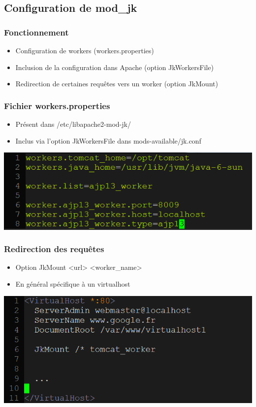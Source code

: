 \subsection{Configuration de mod\_jk}
\begin{frame}
	\frametitle{Fonctionnement}
	
	\begin{itemize}
		\item Configuration de \og{} workers \fg{} (workers.properties)
		\item Inclusion de la configuration dans Apache (option JkWorkersFile)
		\item Redirection de certaines requêtes vers un worker (option JkMount)
	\end{itemize}
\end{frame}

\begin{frame}
	\frametitle{Fichier workers.properties}
	
	\begin{itemize}
		\item Présent dans /etc/libapache2-mod-jk/		
		\item Inclus via l'option JkWorkersFile dans mods-available/jk.conf
	\end{itemize}

	
	\begin{center}
		\includegraphics[scale=0.6]{Images/workers-properties.png}
	\end{center}
\end{frame}

\begin{frame}
	\frametitle{Redirection des requêtes}
	
	\begin{itemize}
		\item Option JkMount <url> <worker\_name>		
		\item En général spécifique à un virtualhost
	\end{itemize}

	\begin{center}
		\includegraphics[scale=0.5]{Images/jkmount-example.png}
	\end{center}

\end{frame}

